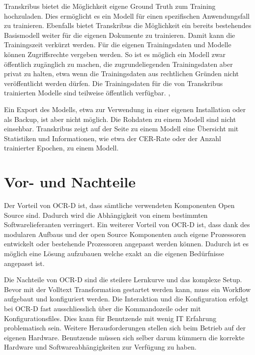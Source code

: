 \documentclass[a4paper,oneside, 12pt]{report}
\begin{document}
Transkribus bietet die Möglichkeit eigene Ground Truth zum Training hochzuladen. Dies ermöglicht es ein Modell für einen spezifischen Anwendungsfall zu trainieren. Ebenfalls bietet Transkribus die Möglichkeit ein bereits bestehendes Basismodell weiter für die eigenen Dokumente zu trainieren. Damit kann die Trainingszeit verkürzt werden. Für die eigenen Trainingsdaten und Modelle können Zugriffsrechte vergeben werden. So ist es möglich ein Modell zwar öffentlich zugänglich zu machen, die zugrundeliegenden Trainingsdaten aber privat zu halten, etwa wenn die Trainingsdaten aus rechtlichen Gründen nicht veröffentlicht werden dürfen. Die Trainingsdaten für die von Transkribus trainierten Modelle sind teilweise öffentlich verfügbar. \cite{diem_markus_2017_1491441}, \cite{transkribusmodels}

Ein Export des Modells, etwa zur Verwendung in einer eigenen Installation oder als Backup, ist aber nicht möglich. Die Rohdaten zu einem Modell sind nicht einsehbar. Transkribus zeigt auf der Seite zu einem Modell eine Übersicht mit Statistiken und Informationen, wie etwa der CER-Rate oder der Anzahl trainierter Epochen, zu einem Modell. \cite{transkribusmodels}


\section{Vor- und Nachteile}
Der Vorteil von OCR-D ist, dass sämtliche verwendeten Komponenten Open Source sind. Dadurch wird die Abhängigkeit von einem bestimmten Softwarelieferanten verringert. Ein weiterer Vorteil von OCR-D ist, dass dank des modularen Aufbaus und der open Source Komponenten auch eigene Prozessoren entwickelt oder bestehende Prozessoren angepasst werden können. Dadurch ist es möglich eine Lösung aufzubauen welche exakt an die eigenen Bedürfnisse angepasst ist.

Die Nachteile von OCR-D sind die steilere Lernkurve und das komplexe Setup. Bevor mit der Volltext Transformation gestartet werden kann, muss ein Workflow aufgebaut und konfiguriert werden. Die Interaktion und die Konfiguration erfolgt bei OCR-D fast ausschliesslich über die Kommandozeile oder mit Konfigurationsfiles. Dies kann für Benutzende mit wenig IT Erfahrung problematisch sein. Weitere Herausforderungen stellen sich beim Betrieb auf der eigenen Hardware. Benutzende müssen sich selber darum kümmern die korrekte Hardware und Softwareabhängigkeiten zur Verfügung zu haben.
\end{document}
